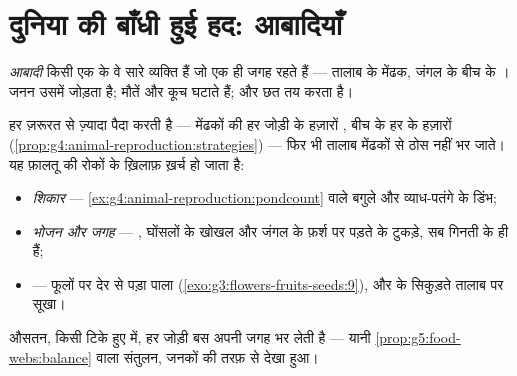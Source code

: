 \section{दुनिया की बाँधी हुई हद: आबादियाँ}

\begin{definition}[आबादी]\label{def:g8:reproduction-and-environment:population}
\emph{आबादी} किसी एक  के वे सारे व्यक्ति हैं जो एक
ही जगह रहते हैं --- तालाब के मेंढक, जंगल के बीच के । जनन उसमें
जोड़ता है; मौतें और कूच घटाते हैं; और छत  तय करता है।
\end{definition}

\begin{proposition}[आबादियाँ फटकर बढ़ क्यों नहीं जातीं]\label{prop:g8:reproduction-and-environment:limits}
हर  ज़रूरत से ज़्यादा पैदा करती है --- मेंढकों की हर जोड़ी के
हज़ारों , बीच के हर  के हज़ारों 
(\cref{prop:g4:animal-reproduction:strategies}) --- फिर भी तालाब
मेंढकों से ठोस नहीं भर जाते। यह फ़ालतू  की रोकों के ख़िलाफ़
ख़र्च हो जाता है:
\begin{itemize}
  \item \emph{शिकार} --- \cref{ex:g4:animal-reproduction:pondcount}
        वाले बगुले और व्याध-पतंगे के डिंभ;
  \item \emph{भोजन और जगह} --- , घोंसलों के खोखल और जंगल के
        फ़र्श पर पड़ते  के टुकड़े, सब गिनती के ही हैं;
  \item \emph{} --- फूलों पर देर से पड़ा पाला
        (\cref{exo:g3:flowers-fruits-seeds:9}), और  के
        सिकुड़ते तालाब पर सूखा।
\end{itemize}
औसतन, किसी टिके हुए  में, हर जोड़ी बस अपनी जगह भर लेती है ---
यानी \cref{prop:g5:food-webs:balance} वाला संतुलन, जनकों की तरफ़ से देखा
हुआ।
\end{proposition}
\admitted

